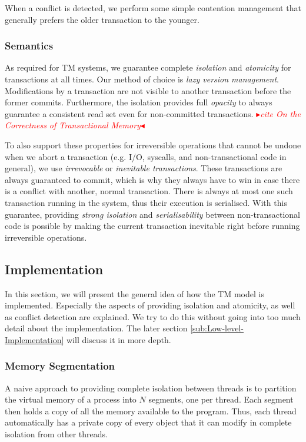 \documentclass{sigplanconf}
\newcommand{\mynote}[2]{%
  \textcolor{red}{%
    \fbox{\bfseries\sffamily\scriptsize#1}%
    {\small$\blacktriangleright$\textsf{\emph{#2}}$\blacktriangleleft$}%
  }%
}
\newcommand\remi[1]{\mynote{Remi}{#1}}
\begin{document}
When a conflict is detected, we perform some simple contention
management that generally prefers the older transaction to the younger.

\subsubsection{Semantics}

As required for TM systems, we guarantee complete \emph{isolation} and
\emph{atomicity} for transactions at all times. Our method of choice
is \emph{lazy version management}. Modifications by a transaction are
not visible to another transaction before the former commits.
Furthermore, the isolation provides full \emph{opacity} to always
guarantee a consistent read set even for non-committed transactions.
\remi{cite On the Correctness of Transactional Memory}

To also support these properties for irreversible operations that
cannot be undone when we abort a transaction (e.g. I/O, syscalls, and
non-transactional code in general), we use \emph{irrevocable} or
\emph{inevitable transactions}. These transactions are always
guaranteed to commit, which is why they always have to win in case
there is a conflict with another, normal transaction. There is always
at most one such transaction running in the system, thus their
execution is serialised. With this guarantee, providing \emph{strong
isolation} and \emph{serialisability} between non-transactional code
is possible by making the current transaction inevitable right before
running irreversible operations.


\subsection{Implementation}

In this section, we will present the general idea of how the TM model
is implemented. Especially the aspects of providing isolation and
atomicity, as well as conflict detection are explained. We try to do
this without going into too much detail about the implementation.  The
later section \ref{sub:Low-level-Implementation} will discuss it in
more depth.


\subsubsection{Memory Segmentation}

A naive approach to providing complete isolation between threads is to
partition the virtual memory of a process into $N$ segments, one per
thread. Each segment then holds a copy of all the memory available to
the program. Thus, each thread automatically has a private copy of
every object that it can modify in complete isolation from other
threads.
\end{document}
